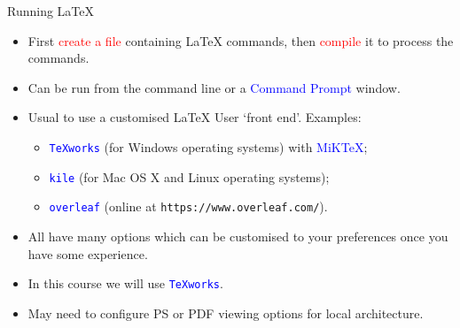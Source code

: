 \documentclass{beamer}
\newcommand{\bi}{\begin{itemize}}
\newcommand{\ei}{\end{itemize}}
\newcommand{\lx}{{\LaTeX} }
\def\mynormal{\vspace*{-0.5cm}}
\begin{document}
\begin{frame}{Running \lx}
\bi
\item First \textcolor{red}{create a file} containing \lx commands, then 
\textcolor{red}{compile} it to process the commands.
\pause
\medskip
\item Can be run from the command line or a \textcolor{blue}{Command Prompt} 
window.
\medskip
\pause
\item Usual to use a customised \lx User `front end'.
Examples:
\bi
\item \textcolor{blue}{\texttt{TeXworks}} (for Windows operating systems) with
\textcolor{blue}{MiK\TeX};
\item \textcolor{blue}{\texttt{kile}} (for Mac OS X and Linux operating 
systems);
\item \textcolor{blue}{\texttt{overleaf}} (online at 
\texttt{https://www.overleaf.com/}).
\ei
\medskip
\pause
\item All have many options which can be customised to your preferences 
once you have some experience.
\medskip
\pause
\item In this course we will use \textcolor{blue}{\texttt{TeXworks}}.
\medskip
\pause
\item May need to configure PS or PDF viewing options for local 
architecture.
\ei
\end{frame}
\end{document}
